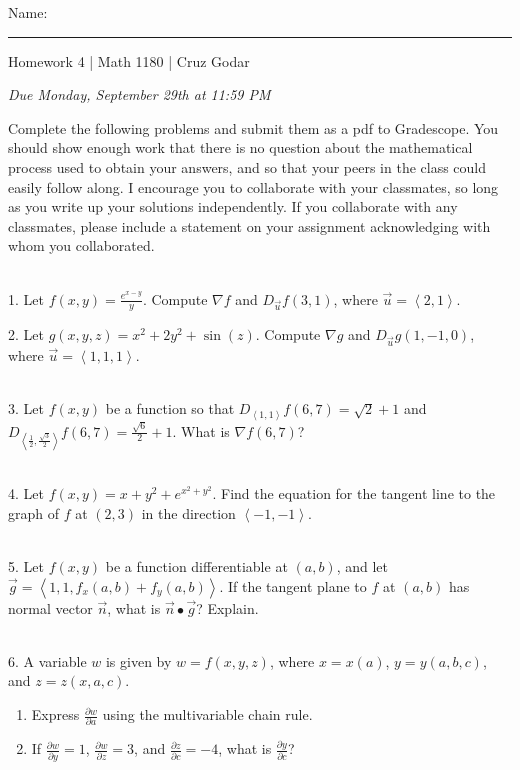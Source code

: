 \documentclass{article}
\begin{document}
\Large Name: \rule{2in}{0.15mm} \hfill Homework 4 | Math 1180 | Cruz Godar \vspace{4pt} \normalsize

\textit{Due Monday, September 29th at 11:59 PM}

Complete the following problems and submit them as a pdf to Gradescope. You should show enough work that there is no question about the mathematical process used to obtain your answers, and so that your peers in the class could easily follow along. I encourage you to collaborate with your classmates, so long as you write up your solutions independently. If you collaborate with any classmates, please include a statement on your assignment acknowledging with whom you collaborated.

~\\

1. Let $f(x, y) = \frac{e^{x - y}}{y}$. Compute $\nabla\! f$ and $D_{\vec{u}}f(3, 1)$, where $\vec{u} = \left< 2, 1 \right>$.

2. Let $g(x, y, z) = x^2 + 2y^2 + \sin(z)$. Compute $\nabla\! g$ and $D_{\vec{u}}g(1, -1, 0)$, where $\vec{u} = \left< 1, 1, 1 \right>$.

~\\

3. Let $f(x, y)$ be a function so that $D_{\left< 1, 1 \right>}f(6, 7) = \sqrt{2} + 1$ and $D_{\left< \frac{1}{2}, \frac{\sqrt{3}}{2} \right>}f(6, 7) = \frac{\sqrt{6}}{2} + 1$. What is $\nabla\! f (6, 7)$?

~\\

4. Let $f(x, y) = x + y^2 + e^{x^2 + y^2}$. Find the equation for the tangent line to the graph of $f$ at $(2, 3)$ in the direction $\left< -1, -1 \right>$.

~\\

5. Let $f(x, y)$ be a function differentiable at $(a, b)$, and let $\vec{g} = \left< 1, 1, f_x(a, b) + f_y(a, b) \right>$. If the tangent plane to $f$ at $(a, b)$ has normal vector $\vec{n}$, what is $\vec{n} \bullet \vec{g}$? Explain.

~\\

6. A variable $w$ is given by $w = f(x, y, z)$, where $x = x(a)$, $y = y(a, b, c)$, and $z = z(x, a, c)$.

\begin{enumerate}

	\item Express $\frac{\partial w}{\partial a}$ using the multivariable chain rule.

	\item If $\frac{\partial w}{\partial y} = 1$, $\frac{\partial w}{\partial z} = 3$, and $\frac{\partial z}{\partial c} = -4$, what is $\frac{\partial y}{\partial c}$?

\end{enumerate}
\end{document}
